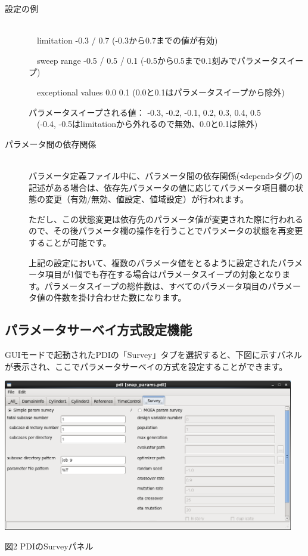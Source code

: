 \documentclass[a4paper,11pt]{jarticle}
\begin{document}
\begin{description}
\item[設定の例] \begin{tt}{\ }\\
　limitation -0.3 / 0.7 (-0.3から0.7までの値が有効)

　sweep range -0.5 / 0.5 / 0.1 (-0.5から0.5まで0.1刻みでパラメータスイープ)

　exceptional values 0.0 0.1 (0.0と0.1はパラメータスイープから除外)

パラメータスイープされる値： -0.3, -0.2, -0.1,   0.2,  0.3,  0.4,  0.5\\
　(-0.4, -0.5はlimitationから外れるので無効、0.0と0.1は除外)
\end{tt}

\item[パラメータ間の依存関係]{\ }\\
パラメータ定義ファイル中に、パラメータ間の依存関係(\texttt{<}depend\texttt{>}タグ)の記述がある場合は、依存先パラメータの値に応じてパラメータ項目欄の状態の変更（有効/無効、値設定、値域設定）が行われます。

ただし、この状態変更は依存先のパラメータ値が変更された際に行われるので、その後パラメータ欄の操作を行うことでパラメータの状態を再変更することが可能です。

上記の設定において、複数のパラメータ値をとるように設定されたパラメータ項目が1個でも存在する場合はパラメータスイープの対象となります。パラメータスイープの総件数は、すべてのパラメータ項目のパラメータ値の件数を掛け合わせた数になります。
\end{description}


\subsection{パラメータサーベイ方式設定機能}

GUIモードで起動されたPDIの「Survey」タブを選択すると、下図に示すパネルが表示され、ここでパラメータサーベイの方式を設定することができます。

\begin{center}
\includegraphics[width=360pt, bb=0 0 984 511]{figs/fig002.png}

図2 PDIのSurveyパネル
\end{center}
\end{document}
